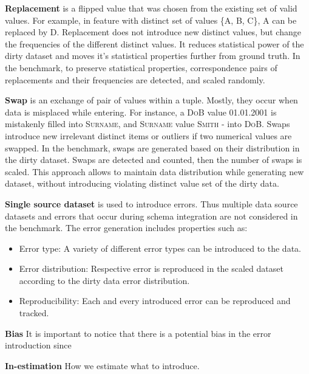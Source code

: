 
\textbf{Replacement} is a flipped value that was chosen from the existing set of valid values. 
For example, in feature with distinct set of values \textsc{\{A, B, C\}}, \textsc{A} can be replaced by \textsc{D}. 
Replacement does not introduce new distinct values, but change the frequencies of the different distinct values. 
It reduces statistical power of the dirty dataset and moves it's statistical properties further from ground truth.
In the benchmark, to preserve statistical properties, correspondence pairs of replacements and their frequencies are detected, and scaled randomly. 


\textbf{Swap} is an exchange of pair of values within a tuple. 
Mostly, they occur when data is misplaced while entering.
For instance, a \textsc{DoB} value \textsc{01.01.2001} is mistakenly filled into \textsc{Surname}, and \textsc{Surname} value \textsc{Smith} - into \textsc{DoB}.
Swaps introduce new irrelevant distinct items or outliers if two numerical values are swapped.
In the benchmark, swaps are generated based on their distribution in the dirty dataset. Swaps are detected and counted, then the number of swaps is scaled. This approach allows to maintain data distribution while generating new dataset, without introducing violating distinct value set of the dirty data.

\textbf{Single source dataset} is used to introduce errors. 
Thus multiple data source datasets and errors that occur during schema integration are not considered in the benchmark.
The error generation includes properties such as:
\begin{itemize}
    \item Error type: A variety of different error types can be introduced to the data.
    \item Error distribution: Respective error is reproduced in the scaled dataset according to the dirty data error distribution.
    \item Reproducibility: Each and every introduced error can be reproduced and tracked.
\end{itemize}

\textbf{Bias}
It is important to notice that there is a potential bias in the error introduction since

\textbf{In-estimation} 
How we estimate what to introduce.
